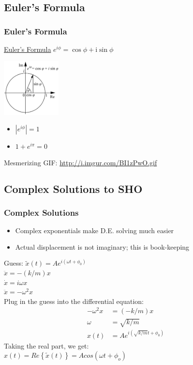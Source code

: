 \documentclass[pdf,hideothersubsections]{beamer}
\begin{document}
\subsection{Euler's Formula}
\begin{frame}
\frametitle{Euler's Formula}

\begin{block}{\href{http://mathworld.wolfram.com/EulerFormula.html}{Euler's Formula}}
$e^{i \phi} = \cos{\phi} + \mathrm{i} \sin{\phi}$
\end{block}
\pause
\includegraphics[width=3cm]{Euler-formula.png}
\pause
\begin{itemize}
\item $|e^{i \phi}| = 1$
\pause
\item $1 + e^{i \pi} = 0$
\end{itemize}

Mesmerizing GIF: \url{http://i.imgur.com/BI1zPwO.gif}

\end{frame}

\subsection{Complex Solutions to SHO}
\begin{frame}
\frametitle{Complex Solutions}
\begin{itemize}
\item Complex exponentials make D.E. solving much easier
\pause
\item Actual displacement is not imaginary; this is book-keeping
\pause
\end{itemize}
Guess: $\tilde{x}(t) = A e^{i (\omega t + \phi_0)}$ \\
\pause
$\ddot{x} = -(k/m) x$ \\
\pause
$\dot{x} = i \omega x$ \\
\pause
$\ddot{x} = -\omega^2 x$ \\
Plug in the guess into the differential equation:
\begin{align*}
-\omega^2 x &= (-k/m) x \\
\omega &= \sqrt{k/m} \\
x(t) &= A e^{i (\sqrt{k/m} t + \phi_0)}
\end{align*}
\pause
Taking the real part, we get: \\
\pause
$x(t) = Re\left\{\tilde{x}(t)\right\} = A cos(\omega t + \phi_o)$

\end{frame}
\end{document}
